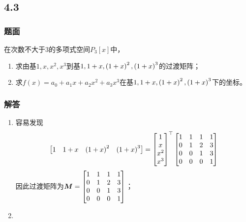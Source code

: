 \documentclass{beamer}
\begin{document}
\subsection*{4.3}
\begin{frame}
    \frametitle{题面}
    在次数不大于\(3\)的多项式空间\(P_3[x]\)中，
    \begin{enumerate}
        \item 求由基\(1,x,x^2,x^3\)到基\(1,1+x,\left( 1+x \right)^2,\left( 1+x \right)^3\)的过渡矩阵；
        \item 求\(f(x)=a_0+a_1x+a_2x^2+a_3x^3\)在基\(1,1+x,\left( 1+x \right)^2,\left( 1+x \right)^3\)下的坐标。
    \end{enumerate}
\end{frame}

\begin{frame}[allowframebreaks]
    \frametitle{解答}
    \begin{enumerate}
        \item {
              容易发现
              \begin{equation*}
                  \begin{bmatrix}
                      1 & 1+x & \left( 1+x \right)^2 & \left( 1+x \right)^3
                  \end{bmatrix}=
                  \begin{bmatrix}
                      1 \\ x \\ x^2 \\ x^3
                  \end{bmatrix}^\top
                  \begin{bmatrix}
                      1 & 1 & 1 & 1 \\
                      0 & 1 & 2 & 3 \\
                      0 & 0 & 1 & 3 \\
                      0 & 0 & 0 & 1
                  \end{bmatrix}
              \end{equation*}
              因此过渡矩阵为\(\boldsymbol{M}=
              \begin{bmatrix}
                  1 & 1 & 1 & 1 \\
                  0 & 1 & 2 & 3 \\
                  0 & 0 & 1 & 3 \\
                  0 & 0 & 0 & 1
              \end{bmatrix}\)；
              }
        \item {
}
\end{enumerate}
\end{frame}
\end{document}
